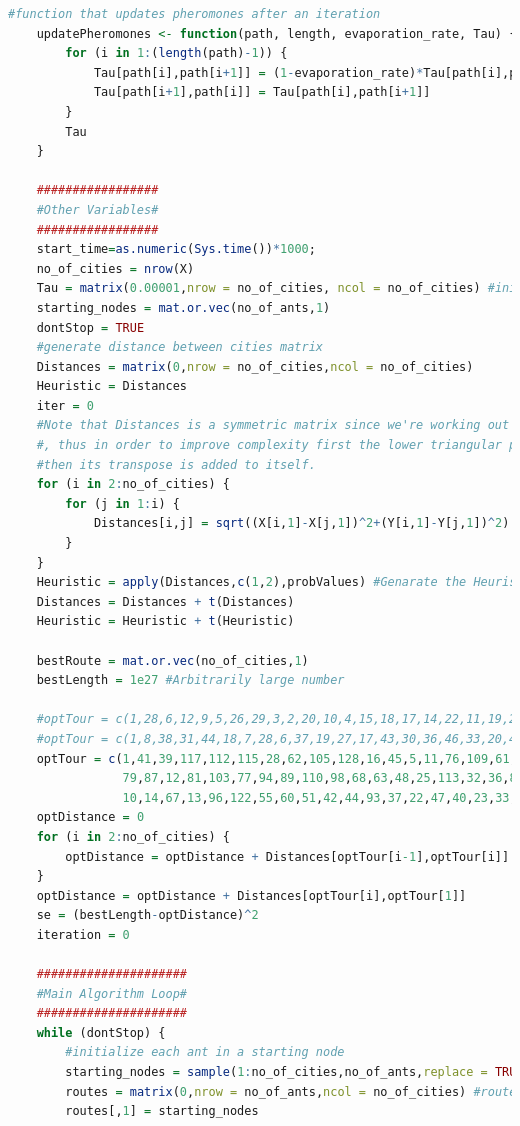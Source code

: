 \documentclass[11pt,a4paper,final]{article}
\begin{document}
\begin{lstlisting}[language = R, caption= ACO Code, label=ACOCode]
	#function that updates pheromones after an iteration
	updatePheromones <- function(path, length, evaporation_rate, Tau) {
		for (i in 1:(length(path)-1)) {
			Tau[path[i],path[i+1]] = (1-evaporation_rate)*Tau[path[i],path[i+1]]+evaporation_rate*(length)^(-1);
			Tau[path[i+1],path[i]] = Tau[path[i],path[i+1]] 
		}
		Tau
	}
	
	#################
	#Other Variables#
	#################
	start_time=as.numeric(Sys.time())*1000;
	no_of_cities = nrow(X)
	Tau = matrix(0.00001,nrow = no_of_cities, ncol = no_of_cities) #initial pheromone matrix
	starting_nodes = mat.or.vec(no_of_ants,1)
	dontStop = TRUE
	#generate distance between cities matrix
	Distances = matrix(0,nrow = no_of_cities,ncol = no_of_cities)
	Heuristic = Distances
	iter = 0
	#Note that Distances is a symmetric matrix since we're working out the Symetric TSP
	#, thus in order to improve complexity first the lower triangular part is worked out, 
	#then its transpose is added to itself.
	for (i in 2:no_of_cities) {
		for (j in 1:i) {
			Distances[i,j] = sqrt((X[i,1]-X[j,1])^2+(Y[i,1]-Y[j,1])^2)
		}
	}
	Heuristic = apply(Distances,c(1,2),probValues) #Genarate the Heuristic Matrix (see function probValues)
	Distances = Distances + t(Distances)
	Heuristic = Heuristic + t(Heuristic)
	
	bestRoute = mat.or.vec(no_of_cities,1)
	bestLength = 1e27 #Arbitrarily large number
	
	#optTour = c(1,28,6,12,9,5,26,29,3,2,20,10,4,15,18,17,14,22,11,19,25,7,23,27,8,24,16,13,21)#bays29
	#optTour = c(1,8,38,31,44,18,7,28,6,37,19,27,17,43,30,36,46,33,20,47,21,32,39,48,5,42,24,10,45,35,4,26,2,29,34,41,16,22,3,23,14,25,13,11,12,15,40,9)#att48
	optTour = c(1,41,39,117,112,115,28,62,105,128,16,45,5,11,76,109,61,129,124,64,69,86,88,26,7,97,70,107,127,104,43,34,17,31,27,19,100,15,29,24,116,95,
				79,87,12,81,103,77,94,89,110,98,68,63,48,25,113,32,36,84,119,111,123,101,82,57,9,56,65,52,75,74,99,73,92,38,106,53,120,58,49,72,91,6,102,
				10,14,67,13,96,122,55,60,51,42,44,93,37,22,47,40,23,33,21,126,121,78,66,85,125,90,59,30,83,3,114,108,8,18,46,80,118,20,4,35,54,2,50,130,71)#ch130
	optDistance = 0
	for (i in 2:no_of_cities) {
		optDistance = optDistance + Distances[optTour[i-1],optTour[i]]
	}
	optDistance = optDistance + Distances[optTour[i],optTour[1]]
	se = (bestLength-optDistance)^2
	iteration = 0
	
	#####################
	#Main Algorithm Loop#
	#####################
	while (dontStop) {
		#initialize each ant in a starting node
		starting_nodes = sample(1:no_of_cities,no_of_ants,replace = TRUE)
		routes = matrix(0,nrow = no_of_ants,ncol = no_of_cities) #routes will store the routes of the ants
		routes[,1] = starting_nodes
	

\end{lstlisting}
\end{document}
